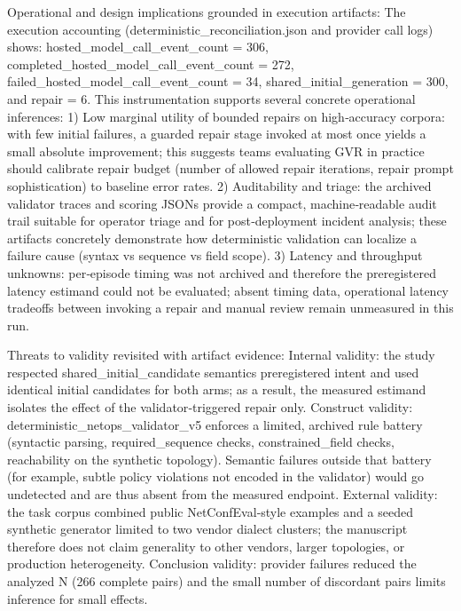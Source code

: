 \documentclass[conference]{IEEEtran}
\begin{document}
Operational and design implications grounded in execution artifacts: The execution accounting (deterministic\_reconciliation.json and provider call logs) shows: hosted\_model\_call\_event\_count = 306, completed\_hosted\_model\_call\_event\_count = 272, failed\_hosted\_model\_call\_event\_count = 34, shared\_initial\_generation = 300, and repair = 6. This instrumentation supports several concrete operational inferences:
1) Low marginal utility of bounded repairs on high‑accuracy corpora: with few initial failures, a guarded repair stage invoked at most once yields a small absolute improvement; this suggests teams evaluating GVR in practice should calibrate repair budget (number of allowed repair iterations, repair prompt sophistication) to baseline error rates. 2) Auditability and triage: the archived validator traces and scoring JSONs provide a compact, machine‑readable audit trail suitable for operator triage and for post‑deployment incident analysis; these artifacts concretely demonstrate how deterministic validation can localize a failure cause (syntax vs sequence vs field scope). 3) Latency and throughput unknowns: per‑episode timing was not archived and therefore the preregistered latency estimand could not be evaluated; absent timing data, operational latency tradeoffs between invoking a repair and manual review remain unmeasured in this run.

Threats to validity revisited with artifact evidence: Internal validity: the study respected shared\_initial\_candidate semantics preregistered intent and used identical initial candidates for both arms; as a result, the measured estimand isolates the effect of the validator‑triggered repair only. Construct validity: deterministic\_netops\_validator\_v5 enforces a limited, archived rule battery (syntactic parsing, required\_sequence checks, constrained\_field checks, reachability on the synthetic topology). Semantic failures outside that battery (for example, subtle policy violations not encoded in the validator) would go undetected and are thus absent from the measured endpoint. External validity: the task corpus combined public NetConfEval‑style examples and a seeded synthetic generator limited to two vendor dialect clusters; the manuscript therefore does not claim generality to other vendors, larger topologies, or production heterogeneity. Conclusion validity: provider failures reduced the analyzed N (266 complete pairs) and the small number of discordant pairs limits inference for small effects.
\end{document}
